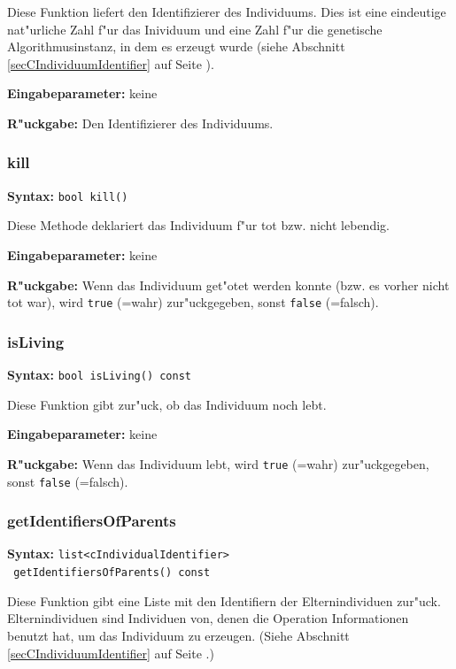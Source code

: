 \bigskip\noindent
Diese Funktion liefert den Identifizierer des Individuums. Dies ist eine eindeutige nat"urliche Zahl f"ur das Inividuum und eine Zahl f"ur die genetische Algorithmusinstanz, in dem es erzeugt wurde (siehe Abschnitt \ref{secCIndividuumIdentifier} auf Seite \pageref{secCIndividuumIdentifier}).

\bigskip\noindent
\textbf{Eingabeparameter:} keine

\bigskip\noindent
\textbf{R"uckgabe:} Den Identifizierer des Individuums.


\subsubsection{kill}

\textbf{Syntax:} \verb|bool kill()|

\bigskip\noindent
Diese Methode deklariert das Individuum f"ur tot bzw. nicht lebendig.

\bigskip\noindent
\textbf{Eingabeparameter:} keine

\bigskip\noindent
\textbf{R"uckgabe:} Wenn das Individuum get"otet werden konnte (bzw. es vorher nicht tot war), wird \verb|true| (=wahr) zur"uckgegeben, sonst \verb|false| (=falsch).


\subsubsection{isLiving}

\textbf{Syntax:} \verb|bool isLiving() const|

\bigskip\noindent
Diese Funktion gibt zur"uck, ob das Individuum noch lebt.

\bigskip\noindent
\textbf{Eingabeparameter:} keine

\bigskip\noindent
\textbf{R"uckgabe:} Wenn das Individuum lebt, wird \verb|true| (=wahr) zur"uckgegeben, sonst \verb|false| (=falsch).


\subsubsection{getIdentifiersOfParents}

\textbf{Syntax:} \verb|list<cIndividualIdentifier>| \\\verb| getIdentifiersOfParents() const|

\bigskip\noindent
Diese Funktion gibt eine Liste mit den Identifiern der Elternindividuen zur"uck. Elternindividuen sind Individuen von, denen die Operation Informationen benutzt hat, um das Individuum zu erzeugen.
(Siehe Abschnitt \ref{secCIndividuumIdentifier} auf Seite \pageref{secCIndividuumIdentifier}.)

